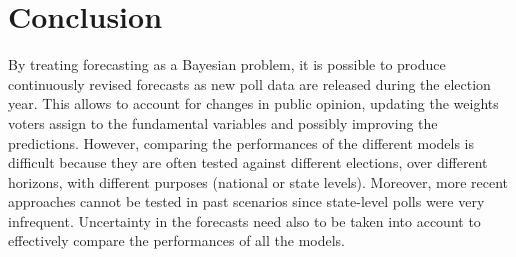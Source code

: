 \documentclass[
  12pt]{article}
\begin{document}
\hypertarget{sec-conc}{%
\section{Conclusion}\label{sec-conc}}

By treating forecasting as a Bayesian problem, it is possible to produce
continuously revised forecasts as new poll data are released during the
election year. This allows to account for changes in public opinion,
updating the weights voters assign to the fundamental variables and
possibly improving the predictions. However, comparing the performances
of the different models is difficult because they are often tested
against different elections, over different horizons, with different
purposes (national or state levels). Moreover, more recent approaches
cannot be tested in past scenarios since state-level polls were very
infrequent. Uncertainty in the forecasts need also to be taken into
account to effectively compare the performances of all the models.
\end{document}
